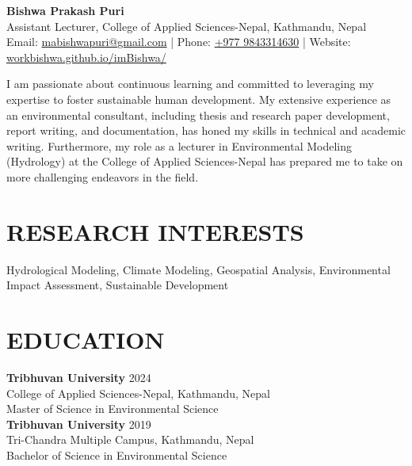 \documentclass[a4paper,9pt]{extarticle}
\begin{document}
\pagestyle{fancy}
\renewcommand{\headrulewidth}{0pt}
\fancyhead{}
\thispagestyle{empty} 

\begin{flushleft}
\textbf{\LARGE Bishwa Prakash Puri}\\[2pt] 
Assistant Lecturer, College of Applied Sciences-Nepal, Kathmandu, Nepal\\
Email: \href{mailto:mabishwapuri@gmail.com}{mabishwapuri@gmail.com} |
Phone: \href{tel:+9779843314630}{+977 9843314630} | 
Website: \href{workbishwa.github.io/imBishwa/}{workbishwa.github.io/imBishwa/}
\end{flushleft}
I am passionate about continuous learning and committed to leveraging my expertise to foster sustainable human development. My extensive experience as an environmental consultant, including thesis and research paper development, report writing, and documentation, has honed my skills in technical and academic writing. Furthermore, my role as a lecturer in Environmental Modeling (Hydrology) at the College of Applied Sciences-Nepal has prepared me to take on more challenging endeavors in the field.

\section*{RESEARCH INTERESTS}
\noindent
Hydrological Modeling, Climate Modeling, Geospatial Analysis, Environmental Impact Assessment, Sustainable Development

\section*{EDUCATION}
\noindent
\textbf{Tribhuvan University} \hfill 2024\\
College of Applied Sciences-Nepal, Kathmandu, Nepal\\
Master of Science in Environmental Science \\


\noindent
\textbf{Tribhuvan University} \hfill 2019\\
Tri-Chandra Multiple Campus, Kathmandu, Nepal\\
Bachelor of Science in Environmental Science\\
\end{document}
